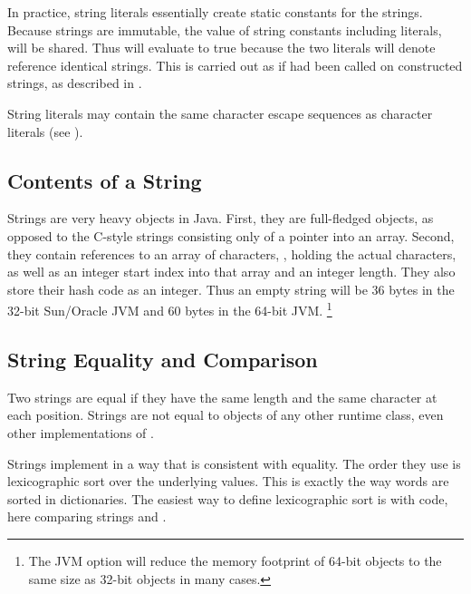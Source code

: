 In practice, string literals essentially create static constants for
the strings.  Because strings are immutable, the value of string
constants including literals, will be shared.  Thus  will evaluate to true because the two literals will denote
reference identical strings.  This is carried out as if
 had been called on constructed strings, as described
in .

String literals may contain the same character escape sequences as
character literals (see ).



\subsection{Contents of a String}

Strings are very heavy objects in Java.  First, they are full-fledged
objects, as opposed to the C-style strings consisting only of a
pointer into an array.  Second, they contain references to an array of
characters, , holding the actual characters, as well as
an integer start index into that array and an integer length.  They
also store their hash code as an integer.  Thus an empty string will
be 36 bytes in the 32-bit Sun/Oracle JVM and 60 bytes in the 64-bit
JVM.%
%
\footnote{The JVM option  will reduce
the memory footprint of 64-bit objects to the same size as 32-bit
objects in many cases.}


\subsection{String Equality and Comparison}

Two strings are equal if they have the same length and the same
character at each position.  Strings are not equal to objects of any
other runtime class, even other implementations of .

Strings implement  in a way that is
consistent with equality.  The order they use is lexicographic
sort over the underlying  values.  This is exactly the
way words are sorted in dictionaries.  The easiest way to define
lexicographic sort is with code, here comparing strings 
and .
%

